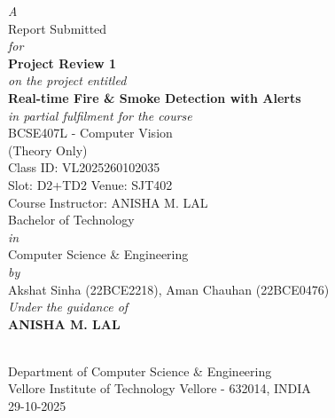 \documentclass[12pt,a4paper]{article}
\newcommand{\optionalinclude}[2]{%
  \IfFileExists{#1}{\texttt{[image: \#1]}}{\fbox{\rule{0pt}{0.35#2}\rule{#2}{0pt}}}}
\begin{document}
\begin{titlepage}
  \centering
\begingroup{}
  {\itshape A\\[0.7em]}
  {\large Report Submitted\\[0.6em]}
  {\itshape for\\[0.6em]}
  {\LARGE\bfseries Project Review 1\\[0.6em]}
  {\itshape on the project entitled\\[0.6em]}
  {\LARGE\bfseries Real-time Fire \& Smoke Detection with Alerts\\[0.9em]}
  {\itshape in partial fulfilment for the course\\[0.5em]}
  {\Large BCSE407L - Computer Vision\\[0.5em]}
  {\small (Theory Only)\\[0.5em]}
  {\small Class ID: VL2025260102035\\[0.3em]}
  {\small Slot: D2+TD2 \textbullet{} Venue: SJT402\\[0.3em]}
  {\small Course Instructor: ANISHA M. LAL\\[0.7em]}
  {\large Bachelor of Technology\\[0.3em]}
  {\itshape in\\[0.3em]}
  {\Large Computer Science \& Engineering\\[0.7em]}
  {\itshape by\\[0.4em]}
  {\large Akshat Sinha (22BCE2218), Aman Chauhan (22BCE0476)\\[0.7em]}
  {\itshape Under the guidance of\\[0.3em]}
  {\Large\bfseries ANISHA M. LAL\\[0.7em]}

  \optionalinclude{VIT LOGO.png}{0.27\textwidth}\\[0.7em]

  {Department of Computer Science \& Engineering\\[0.4em]}
  {Vellore Institute of Technology Vellore - 632014, INDIA\\[0.7em]}
  {29-10-2025}
  \endgroup
\end{titlepage}

\end{document}
